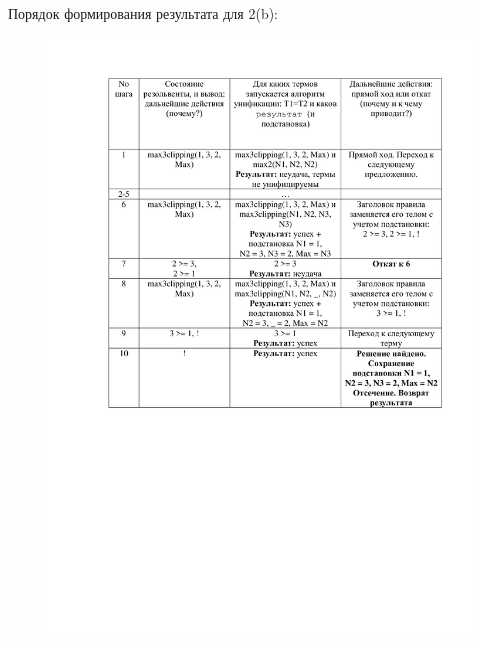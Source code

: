 \documentclass[12pt]{report}
\begin{document}
Порядок формирования результата для 2(b):

\begin{figure}[H]
	\centering
	\includegraphics[scale=0.275]{1.png}
	\label{fig:1}
\end{figure}
\end{document}

